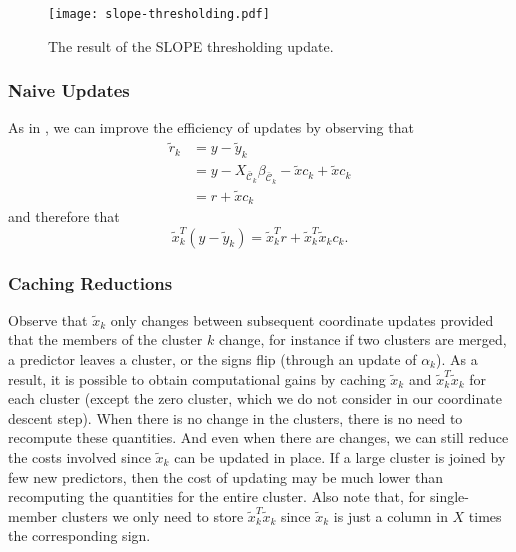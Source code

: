 \begin{figure}[htbp]
  \centering
  \texttt{[image: slope-thresholding.pdf]}
  \caption{The result of the SLOPE thresholding update.}
  \label{fig:slope-thresholding}
\end{figure}

\subsubsection{Naive Updates}

As in \textcite{friedman2010}, we can improve the efficiency of updates by observing that
\begin{equation*}
  \begin{aligned}
    \tilde r_k & = y - \tilde y_k                                                                       \\
               & = y - X_{\bar{\mathcal{C}}_k}\beta_{\bar{\mathcal{C}}_k} - \tilde x c_k + \tilde x c_k \\
               & = r + \tilde x c_k
  \end{aligned}
\end{equation*}
and therefore that
\begin{equation}
  \label{eq:naive-update}
  \tilde x_k^T (y - \tilde y_k) = \tilde x_k^T r + \tilde x_k^T \tilde x_k c_k.
\end{equation}

\subsubsection{Caching Reductions}

Observe that \(\tilde x_k\) only changes between subsequent coordinate updates provided that the members of the cluster \(k\) change, for instance if two clusters are merged, a predictor leaves a cluster, or the signs flip (through an update of \(\alpha_k\)).
As a result, it is possible to obtain computational gains by caching \(\tilde x_k\) and \(\tilde x_k^T \tilde x_k\) for each cluster (except the zero cluster, which we do not consider in our coordinate descent step).
When there is no change in the clusters, there is no need to recompute these quantities.
And even when there are changes, we can still reduce the costs involved since \(\tilde x_k\) can be updated in place.
If a large cluster is joined by few new predictors, then the cost of updating may be much lower than recomputing the quantities for the entire cluster.
Also note that, for single-member clusters we only need to store \(\tilde x_k^T \tilde x_k\) since \(\tilde x_k\) is just a column in \(X\) times the corresponding sign.

